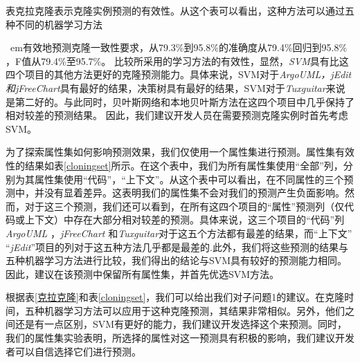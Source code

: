 表{克拉克隆}表示克隆实例预测的有效性。从这个表可以看出，这种方法可以通过五种不同的机器学习方法{\ em有效地预测克隆一致性要求，从79.3\%到95.8\%的准确度从79.4\%回归到95.8\% ，F值从79.4\%至95.7\%。
比较所采用的学习方法的有效性，显然，{\em SVM}具有比这四个项目的其他方法更好的克隆预测能力。具体来说，SVM对于{\em ArgoUML，jEdit和jFreeChart}具有最好的结果，决策树具有最好的结果，SVM对于{\em Tuxguitar}来说是第二好的。与此同时，贝叶斯网络和本地贝叶斯方法在这四个项目中几乎保持了相对较差的预测结果。
因此，我们建议开发人员在需要预测克隆实例时首先考虑SVM。

为了探索属性集如何影响预测效果，我们仅使用一个属性集进行预测。属性集有效性的结果如表\ref{cloningset}所示。在这个表中，我们为所有属性集使用“全部”列，分别为其属性集使用“代码”，“上下文”。从这个表中可以看出，在不同属性的三个预测中，并没有显着差异。这表明我们的属性集不会对我们的预测产生负面影响。然而，对于这三个预测，我们还可以看到，在所有这四个项目的“属性”预测列（仅代码或上下文）中存在大部分相对较差的预测。具体来说，这三个项目的“代码”列{\em ArgoUML \/}，{\em jFreeChart \/}和{\em Tuxguitar}对于这五个方法都有最差的结果，而“上下文” “{\em jEdit}”项目的列对于这五种方法几乎都是最差的.此外，我们将这些预测的结果与五种机器学习方法进行比较，我们得出的结论与SVM具有较好的预测能力相同。因此，建议在该预测中保留所有属性集，并首先优选SVM方法。


根据表\ref{克拉克隆}和表\ref{cloningset}，我们可以给出我们对子问题1的建议。在克隆时间，五种机器学习方法可以应用于这种克隆预测，其结果非常相似。另外，他们之间还是有一点区别，SVM有更好的能力，我们建议开发选择这个来预测。同时，我们的属性集实验表明，所选择的属性对这一预测具有积极的影响，我们建议开发者可以自信选择它们进行预测。

}
